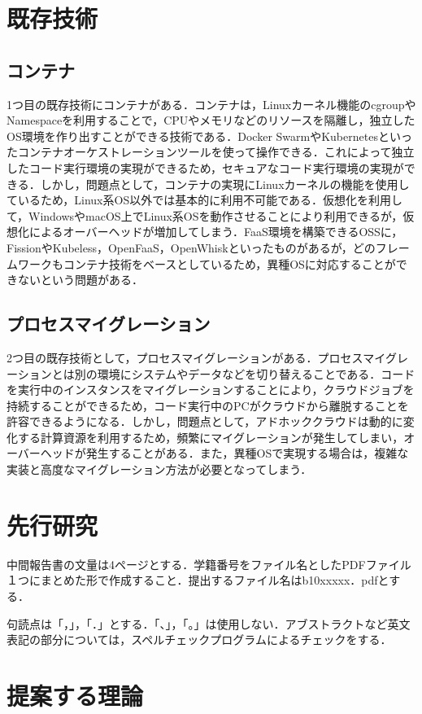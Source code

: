 \documentclass[11pt]{ujarticle} %
\begin{document}
\section{既存技術}
\subsection{コンテナ}
1つ目の既存技術にコンテナがある．コンテナは，Linuxカーネル機能のcgroupやNamespaceを利用することで，CPUやメモリなどのリソースを隔離し，独立したOS環境を作り出すことができる技術である．Docker SwarmやKubernetesといったコンテナオーケストレーションツールを使って操作できる．これによって独立したコード実行環境の実現ができるため，セキュアなコード実行環境の実現ができる．しかし，問題点として，コンテナの実現にLinuxカーネルの機能を使用しているため，Linux系OS以外では基本的に利用不可能である．仮想化を利用して，WindowsやmacOS上でLinux系OSを動作させることにより利用できるが，仮想化によるオーバーヘッドが増加してしまう．FaaS環境を構築できるOSSに，FissionやKubeless，OpenFaaS，OpenWhiskといったものがあるが，どのフレームワークもコンテナ技術をベースとしているため，異種OSに対応することができないという問題がある．

\subsection{プロセスマイグレーション}
2つ目の既存技術として，プロセスマイグレーションがある．プロセスマイグレーションとは別の環境にシステムやデータなどを切り替えることである．コードを実行中のインスタンスをマイグレーションすることにより，クラウドジョブを持続することができるため，コード実行中のPCがクラウドから離脱することを許容できるようになる．しかし，問題点として，アドホッククラウドは動的に変化する計算資源を利用するため，頻繁にマイグレーションが発生してしまい，オーバーヘッドが発生することがある．また，異種OSで実現する場合は，複雑な実装と高度なマイグレーション方法が必要となってしまう．


\section{先行研究}

中間報告書の文量は4ページとする．学籍番号をファイル名としたPDFファイル１つにまとめた形で作成すること．提出するファイル名はb10xxxxx．pdfとする．

句読点は「，」，「．」とする．「、」，「。」は使用しない．アブストラクトなど英文表記の部分については，スペルチェックプログラムによるチェックをする．

\section{提案する理論}
\end{document}
